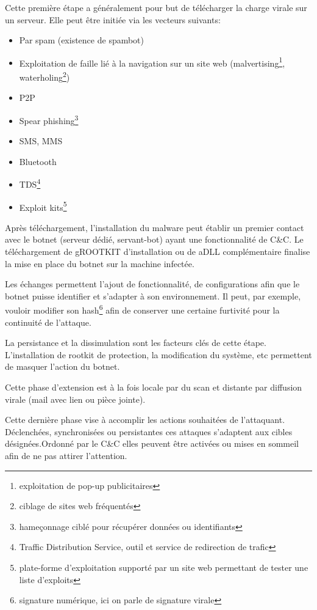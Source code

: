   \head{}
Cette première étape a généralement pour but de télécharger la charge virale sur un serveur.
Elle peut être initiée via les vecteurs suivants:
	 \begin{itemize}
		 \item Par spam (existence de spambot)
		 \item Exploitation de faille lié à la navigation sur un site web (malvertising\footnote{exploitation de pop-up publicitaires}, waterholing\footnote{ciblage de sites web fréquentés})
		 \item P2P
		 \item Spear phishing\footnote{hameçonnage ciblé pour récupérer données ou identifiants}
		 \item SMS, MMS
		 \item Bluetooth
		 \item TDS\footnote{Traffic Distribution Service, outil et service de redirection de trafic}
		 \item Exploit kits\footnote{plate-forme d'exploitation supporté par un site web permettant de tester une liste d'exploits}
	 \end{itemize}
	
Après téléchargement, l'installation du malware peut établir un premier contact avec le botnet (serveur dédié, servant-bot) ayant une fonctionnalité de C\&C.
Le téléchargement de \gls{gROOTKIT} d'installation ou de \gls{aDLL} complémentaire finalise la mise en place du botnet sur la machine infectée.	
	
Les échanges permettent l'ajout de fonctionnalité, de configurations afin que le botnet puisse identifier et s'adapter à son environnement.
Il peut, par exemple, vouloir modifier son hash\footnote{signature numérique, ici on parle de signature virale} afin de conserver une certaine furtivité pour la continuité de l'attaque.

La persistance et la dissimulation sont les facteurs clés de cette étape. L'installation de rootkit de protection, la modification du système, etc permettent de masquer l'action du botnet.
	
Cette phase d'extension est à la fois locale par du scan et distante par diffusion virale (mail avec lien ou pièce jointe).
	
Cette dernière phase vise à accomplir les actions souhaitées de l'attaquant. 
Déclenchées, synchronisées ou persistantes ces attaques s'adaptent aux cibles désignées.Ordonné par le C\&C elles peuvent être activées ou mises en sommeil afin de ne pas attirer l'attention.




